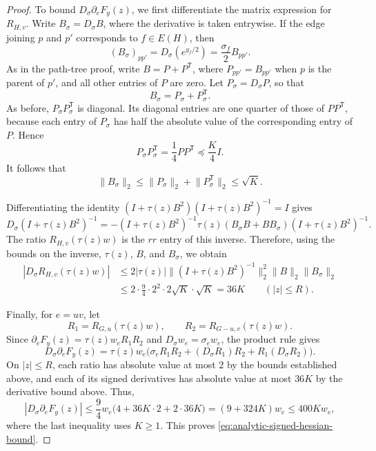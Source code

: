 \documentclass[10pt,a4paper]{amsart}
\newcommand{\norm}[1]{\lVert #1\rVert}
\begin{document}
\begin{proof}
To bound $D_\sigma\partial_eF_y(z)$, we first differentiate the
matrix expression for $R_{H,v}$. Write $B_\sigma=D_\sigma B$,
where the derivative is taken entrywise. If the edge joining
$p$ and $p'$ corresponds to $f\in E(H)$, then
\[
 (B_\sigma)_{pp'}
 =D_\sigma(e^{y_f/2})
 =\frac{\sigma_f}{2}B_{pp'}.
\]
As in the path-tree proof, write $B=P+P^{\mathsf T}$, where
$P_{pp'}=B_{pp'}$ when $p$ is the parent of $p'$, and all other
entries of $P$ are zero. Let $P_\sigma=D_\sigma P$, so that
\[
 B_\sigma=P_\sigma+P_\sigma^{\mathsf T}.
\]
As before, $P_\sigma P_\sigma^{\mathsf T}$ is diagonal.
Its diagonal entries are one quarter of those of
$PP^{\mathsf T}$, because each entry of $P_\sigma$ has half
the absolute value of the corresponding entry of $P$. Hence
\[
 P_\sigma P_\sigma^{\mathsf T}
 =\frac14PP^{\mathsf T}\preceq\frac K4I.
\]
It follows that
\begin{equation*}
 \norm{B_\sigma}_2
 \le\norm{P_\sigma}_2+\norm{P_\sigma^{\mathsf T}}_2
 \le\sqrt K.
\end{equation*}

Differentiating the identity
$(I+\tau(z)B^2)(I+\tau(z)B^2)^{-1}=I$ gives
\[
 D_\sigma(I+\tau(z)B^2)^{-1}
 =-(I+\tau(z)B^2)^{-1}
   \tau(z)(B_\sigma B+BB_\sigma)
   (I+\tau(z)B^2)^{-1}.
\]
The ratio $R_{H,v}(\tau(z)w)$ is the $rr$ entry of this inverse.
Therefore, using the bounds on the inverse, $\tau(z)$, $B$,
and $B_\sigma$, we obtain
\begin{align*}
 |D_\sigma R_{H,v}(\tau(z)w)|
 &\le
 2|\tau(z)|\norm{(I+\tau(z)B^2)^{-1}}_2^2
   \norm B_2\norm{B_\sigma}_2\\
 &\le2\cdot\frac94\cdot2^2\cdot2\sqrt K\cdot\sqrt K
 =36K
 \qquad(|z|\le R).
\end{align*}

Finally, for $e=uv$, let
\[
 R_1=R_{G,u}(\tau(z)w),
 \qquad
 R_2=R_{G-u,v}(\tau(z)w).
\]
Since $\partial_eF_y(z)=\tau(z)w_eR_1R_2$ and
$D_\sigma w_e=\sigma_ew_e$, the product rule gives
\[
 D_\sigma\partial_eF_y(z)
 =\tau(z)w_e\bigl(
   \sigma_eR_1R_2+(D_\sigma R_1)R_2+R_1(D_\sigma R_2)
   \bigr).
\]
On $|z|\le R$, each ratio has absolute value at most $2$
by the bounds established above, and each of its signed derivatives
has absolute value at most $36K$ by
the derivative bound above. Thus,
\[
 |D_\sigma\partial_eF_y(z)|
 \le\frac94w_e\bigl(4+36K\cdot2+2\cdot36K\bigr)
 =(9+324K)w_e
 \le400K w_e,
\]
where the last inequality uses $K\ge1$. This proves
\cref{eq:analytic-signed-hessian-bound}.
\end{proof}
\end{document}

